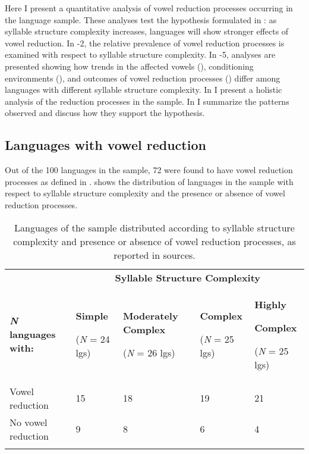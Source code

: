   Here I present a quantitative analysis of vowel reduction processes occurring in the language sample. These analyses test the hypothesis formulated in : as syllable structure complexity increases, languages will show stronger effects of vowel reduction. In -2, the relative prevalence of vowel reduction processes is examined with respect to syllable structure complexity. In -5, analyses are presented showing how trends in the affected vowels (), conditioning environments (), and outcomes of vowel reduction processes () differ among languages with different syllable structure complexity. In  I present a holistic analysis of the reduction processes in the sample. In  I summarize the patterns observed and discuss how they support the hypothesis.

\subsection{Languages with vowel reduction}\label{sec:6.3.1}

  Out of the 100 languages in the sample, 72 were found to have vowel reduction processes as defined in .  shows the distribution of languages in the sample with respect to syllable structure complexity and the presence or absence of vowel reduction processes.

\begin{table}
\begin{tabularx}{\textwidth}{XXXXX}
\lsptoprule
 & \multicolumn{4}{c}{ \textbf{Syllable Structure Complexity}}\\
 \textbf{\textit{N}} \textbf{languages with:} & { \textbf{Simple}}

 (\textit{N} = 24 lgs) & { \textbf{Moderately Complex}}

 (\textit{N} = 26 lgs) & { \textbf{Complex}}

 (\textit{N} = 25 lgs) & { \textbf{Highly} }

{ \textbf{Complex}}

 (\textit{N} = 25 lgs)\\
 Vowel reduction & 15 & 18 & 19 & 21\\
 No vowel reduction & 9 & 8 & 6 & 4\\
\lspbottomrule
\end{tabularx}
\caption{\label{tab:6.1}Languages of the sample distributed according to syllable structure complexity and presence or absence of vowel reduction processes, as reported in sources.}
\end{table}

